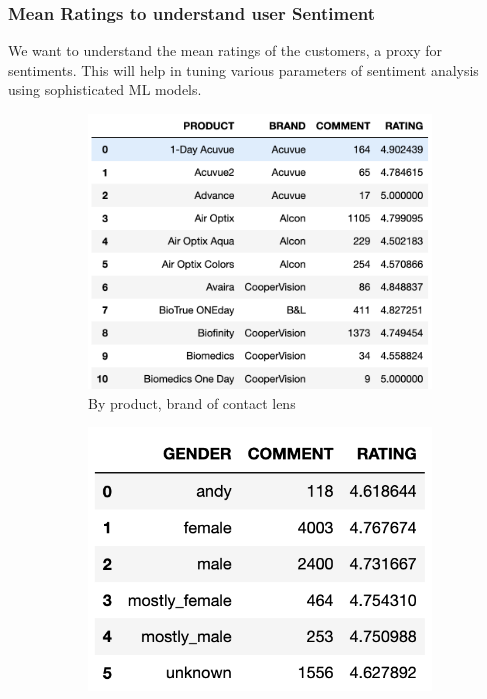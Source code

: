 \documentclass[11pt, letterpaper]{article}
\begin{document}
\subsubsection{Mean Ratings to understand user Sentiment}
We want to understand the mean ratings of the customers, a proxy for sentiments. This will help in tuning various parameters of sentiment analysis using sophisticated ML models.
\begin{figure}[H]%
     \centering
     \begin{subfigure}[b]{0.3\textwidth}
         \centering
         \includegraphics[width=\textwidth]{eda_by_product_brand.png}
         \caption{By product, brand of contact lens}
         \label{fig:bY_product_brand}
     \end{subfigure}
     \hfill
     \begin{subfigure}[b]{0.3\textwidth}
         \centering
         \includegraphics[width=\textwidth]{eda_by_gender.png}

\end{subfigure}
\end{figure}
\end{document}
